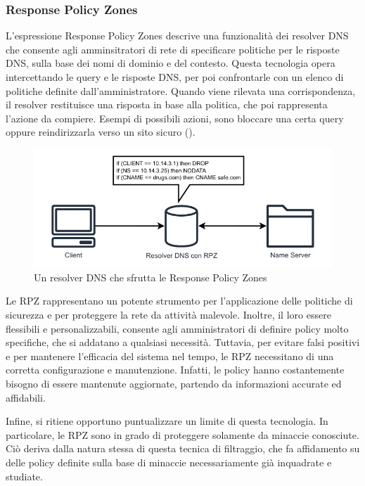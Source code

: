 \subsubsection{Response Policy Zones}
L'espressione Response Policy Zones descrive una funzionalità dei resolver DNS che consente agli amminsitratori di rete di specificare politiche per le risposte DNS, sulla base dei nomi di dominio e del contesto. Questa tecnologia opera intercettando le query e le risposte DNS, per poi confrontarle con un elenco di politiche definite dall'amministratore. Quando viene rilevata una corrispondenza, il resolver restituisce una risposta in base alla politica, che poi rappresenta l'azione da compiere. Esempi di possibili azioni, sono bloccare una certa query oppure reindirizzarla verso un sito sicuro ().

\begin{figure}
  \centering
  \includegraphics[width=1.0\linewidth]{figures/Response_Policy_zones.pdf}
  \caption{Un resolver DNS che sfrutta le Response Policy Zones}
  \label{fig:rpz}
\end{figure}

Le RPZ rappresentano un potente strumento per l'applicazione delle politiche di sicurezza e per proteggere la rete da attività malevole. Inoltre, il loro essere flessibili e personalizzabili, consente agli amministratori di definire policy molto specifiche, che si addatano a qualsiasi necessità. Tuttavia, per evitare falsi positivi e per mantenere l'efficacia del sistema nel tempo, le RPZ necessitano di una corretta configurazione e manutenzione. Infatti, le policy hanno costantemente bisogno di essere mantenute aggiornate, partendo da informazioni accurate ed affidabili.

Infine, si ritiene opportuno puntualizzare un limite di questa tecnologia. In particolare, le RPZ sono in grado di proteggere solamente da minaccie conosciute. Ciò deriva dalla natura stessa di questa tecnica di filtraggio, che fa affidamento su delle policy definite sulla base di minaccie necessariamente già inquadrate e studiate.

